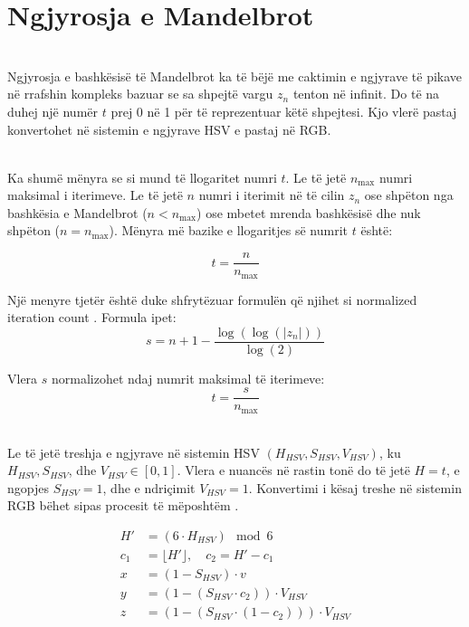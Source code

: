 \section{Ngjyrosja e Mandelbrot}

\noindent \\ Ngjyrosja e bashkësisë të Mandelbrot ka të bëjë me caktimin e ngjyrave të pikave në rrafshin kompleks bazuar se sa shpejtë vargu \(z_n\) tenton në infinit. Do të na duhej një numër \(t\) prej 0 në 1 për të reprezentuar këtë shpejtesi. Kjo vlerë pastaj konvertohet në sistemin e ngjyrave HSV e pastaj në RGB. 

\noindent \\ Ka shumë mënyra se si mund të llogaritet numri \(t\). Le të jetë \(n_\text{max}\) numri maksimal i iterimeve. Le të jetë  \(n\) numri i iterimit në të cilin \(z_n\) ose shpëton nga bashkësia e Mandelbrot  (\(n< n_\text{max}\)) ose mbetet mrenda bashkësisë dhe nuk shpëton (\(n=n_\text{max}\)). Mënyra më bazike e llogaritjes së numrit \(t\) është:

\[ t = \frac{n}{n_{\text{max}}} \]

\noindent Një menyre tjetër është duke shfrytëzuar formulën që njihet si normalized iteration count \cite{complex_colors}. Formula ipet:  
\[  s = n + 1 - \frac{\log(\log(|z_n|))}{\log(2)}\]

\noindent Vlera \(s\) normalizohet ndaj numrit maksimal të iterimeve: 
\[t = \frac{s}{n_{\text{max}}}\]
    

\noindent \\ Le të jetë treshja e ngjyrave në sistemin HSV $(H_{HSV}, S_{HSV}, V_{HSV})$, ku $H_{HSV}, S_{HSV}$, dhe $V_{HSV} \in [0,1]$. Vlera e nuancës në rastin tonë do të jetë $H = t$, e ngopjes $S_{HSV} = 1$, dhe e ndriçimit $V_{HSV} = 1$. Konvertimi i kësaj treshe në sistemin RGB bëhet sipas procesit të mëposhtëm \cite{hsv_rgb}.

\begin{align*}
H' &= (6 \cdot H_{HSV}) \mod 6  \\
c_1 &= \lfloor H' \rfloor, \quad c_2 = H' - c_1 \\
x &= (1 - S_{HSV}) \cdot v \\
y &= (1 - (S_{HSV} \cdot c_2)) \cdot V_{HSV} \\
z &= (1 - (S_{HSV} \cdot (1 - c_2))) \cdot V_{HSV}
\end{align*}

